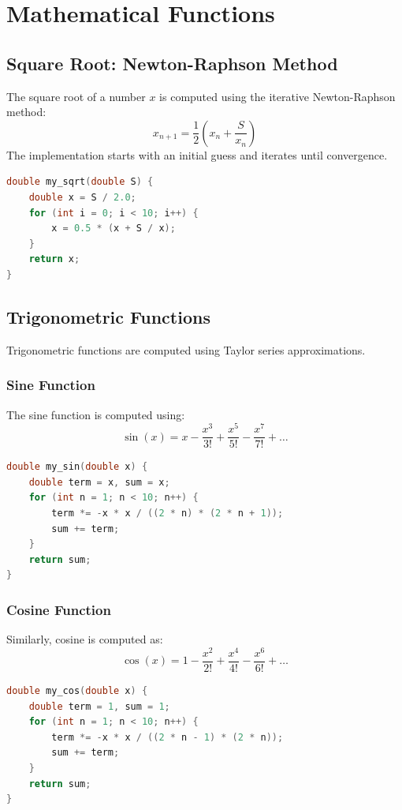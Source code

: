 \documentclass[journal]{IEEEtran}
\begin{document}
\section*{Mathematical Functions}

\subsection*{Square Root: Newton-Raphson Method}
The square root of a number \( x \) is computed using the iterative Newton-Raphson method:
\[
x_{n+1} = \frac{1}{2} \left( x_n + \frac{S}{x_n} \right)
\]
The implementation starts with an initial guess and iterates until convergence.

\begin{lstlisting}[language=C, caption=Square Root Function]
double my_sqrt(double S) {
    double x = S / 2.0;
    for (int i = 0; i < 10; i++) {
        x = 0.5 * (x + S / x);
    }
    return x;
}
\end{lstlisting}

\subsection*{Trigonometric Functions}
Trigonometric functions are computed using Taylor series approximations.

\subsubsection*{Sine Function}
The sine function is computed using:
\[
\sin(x) = x - \frac{x^3}{3!} + \frac{x^5}{5!} - \frac{x^7}{7!} + \dots
\]
\begin{lstlisting}[language=C, caption=Sine Function]
double my_sin(double x) {
    double term = x, sum = x;
    for (int n = 1; n < 10; n++) {
        term *= -x * x / ((2 * n) * (2 * n + 1));
        sum += term;
    }
    return sum;
}
\end{lstlisting}

\subsubsection*{Cosine Function}
Similarly, cosine is computed as:
\[
\cos(x) = 1 - \frac{x^2}{2!} + \frac{x^4}{4!} - \frac{x^6}{6!} + \dots
\]
\begin{lstlisting}[language=C, caption=Cosine Function]
double my_cos(double x) {
    double term = 1, sum = 1;
    for (int n = 1; n < 10; n++) {
        term *= -x * x / ((2 * n - 1) * (2 * n));
        sum += term;
    }
    return sum;
}
\end{lstlisting}
\end{document}
